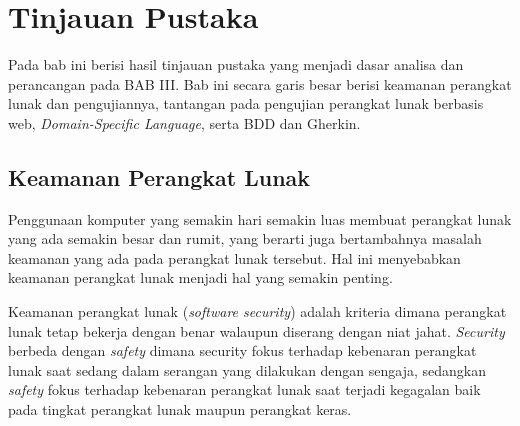 \chapter{Tinjauan Pustaka}

Pada bab ini berisi hasil tinjauan pustaka yang menjadi dasar analisa dan perancangan pada BAB III.
Bab ini secara garis besar berisi keamanan perangkat lunak dan pengujiannya,
tantangan pada pengujian perangkat lunak berbasis web, \emph{Domain-Specific Language}, serta BDD dan Gherkin.



\section{Keamanan Perangkat Lunak}

Penggunaan komputer yang semakin hari semakin luas membuat perangkat lunak yang ada semakin besar dan rumit,
yang berarti juga bertambahnya masalah keamanan yang ada pada perangkat lunak tersebut.
Hal ini menyebabkan keamanan perangkat lunak menjadi hal yang semakin penting.

Keamanan perangkat lunak (\emph{software security}) adalah kriteria dimana perangkat lunak tetap bekerja
dengan benar walaupun diserang dengan niat jahat.
\emph{Security} berbeda dengan \emph{safety}
dimana security fokus terhadap kebenaran
perangkat lunak saat sedang dalam serangan yang dilakukan dengan sengaja, sedangkan \emph{safety} fokus terhadap
kebenaran perangkat lunak saat terjadi kegagalan baik pada tingkat perangkat lunak maupun perangkat keras.

